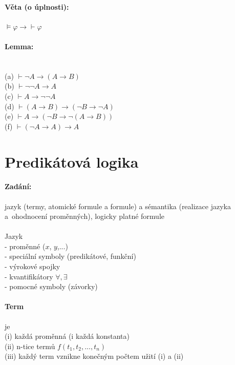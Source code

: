 \documentclass[a4]{report}
\theoremstyle{definition}
\begin{document}
\paragraph*{Věta (o úplnosti):}
$\models \varphi \rightarrow \vdash \varphi $

\paragraph*{Lemma:} ~\\
(a) $\vdash \neg A \rightarrow (A \rightarrow B)$\\
(b) $\vdash \neg \neg A \rightarrow A$\\
(c) $\vdash A \rightarrow \neg \neg A$\\
(d) $\vdash (A\rightarrow B) \rightarrow (\neg B \rightarrow \neg A)$\\
(e) $\vdash A \rightarrow (\neg B \rightarrow \neg(A\rightarrow B)) $\\
(f) $\vdash (\neg A \rightarrow A) \rightarrow A $

\section{Predikátová logika}
% 
\paragraph*{Zadání:}
jazyk (termy, atomické formule a formule) a sémantika (realizace jazyka a~ohodnocení proměnných), logicky platné formule\\
~\\
Jazyk\\
- proměnné ($x$, $y$,...)\\
- speciální symboly (predikátové, funkční)\\
- výrokové spojky\\
- kvantifikátory $\forall , \exists$\\
- pomocné symboly (závorky)

\paragraph*{Term} je\\
(i) každá proměnná (i každá konstanta)\\
(ii) n-tice termů $f(t_1,t_2,...,t_n)$\\
(iii) každý term vznikne konečným počtem užití (i) a (ii)
\end{document}
